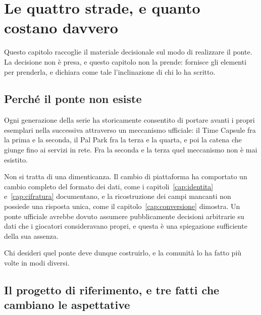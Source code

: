 
\chapter{Le quattro strade, e quanto costano davvero}
\label{cap:opzioni}

Questo capitolo raccoglie il materiale decisionale sul modo di realizzare il ponte. La decisione non è presa, e questo capitolo non la prende: fornisce gli elementi per prenderla, e dichiara come tale l'inclinazione di chi lo ha scritto.

\section{Perché il ponte non esiste}

Ogni generazione della serie ha storicamente consentito di portare avanti i propri esemplari nella successiva attraverso un meccanismo ufficiale: il Time Capsule fra la prima e la seconda, il Pal Park fra la terza e la quarta, e poi la catena che giunge fino ai servizi in rete. Fra la seconda e la terza quel meccanismo non è mai esistito.

Non si tratta di una dimenticanza. Il cambio di piattaforma ha comportato un cambio completo del formato dei dati, come i capitoli~\ref{cap:identita} e~\ref{cap:cifratura} documentano, e la ricostruzione dei campi mancanti non possiede una risposta unica, come il capitolo~\ref{cap:conversione} dimostra. Un ponte ufficiale avrebbe dovuto assumere pubblicamente decisioni arbitrarie su dati che i giocatori consideravano propri, e questa è una spiegazione sufficiente della sua assenza.

Chi desideri quel ponte deve dunque costruirlo, e la comunità lo ha fatto più volte in modi diversi.

\section{Il progetto di riferimento, e tre fatti che cambiano le aspettative}


